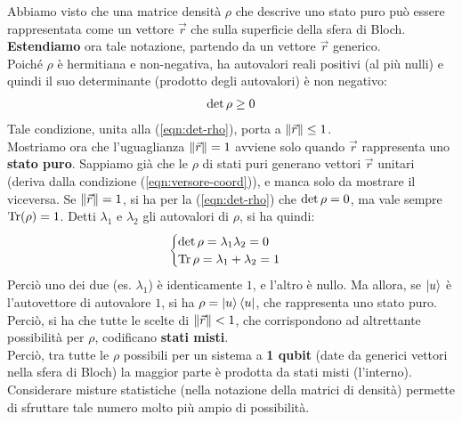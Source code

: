 \documentclass[../../InformazioneQuantistica.tex]{subfiles}
\begin{document}
Abbiamo visto che una matrice densità $\rho$ che descrive uno stato puro può essere rappresentata come un vettore $\vec{r}$ che  sulla superficie della sfera di Bloch.\\

 \textbf{Estendiamo} ora tale notazione, partendo da un vettore $\vec{r}$ generico.\\
Poiché $\rho$ è hermitiana e non-negativa, ha autovalori reali positivi (al più nulli) e quindi il suo determinante (prodotto degli autovalori) è non negativo:
\begin{align*}
\operatorname{det}\rho \geq 0
\end{align*}
Tale condizione, unita alla (\ref{eqn:det-rho}), porta a $\left\lVert\vec{r}\right\rVert\leq 1$.\\

Mostriamo ora che l'uguaglianza $\left\lVert\vec{r}\right\rVert=1$ avviene solo quando $\vec{r}$ rappresenta uno \textbf{stato puro}. Sappiamo già che le $\rho$ di stati puri generano vettori $\vec{r}$ unitari (deriva dalla condizione (\ref{eqn:versore-coord})), e manca solo da mostrare il viceversa. Se $\left\lVert\vec{r}\right\rVert=1$, si ha per la (\ref{eqn:det-rho}) che $\operatorname{det}\rho = 0$, ma vale sempre $\operatorname{Tr}(\rho)=1$. Detti $\lambda_1$ e $\lambda_2$ gli autovalori di $\rho$, si ha quindi:
\begin{align*}
\begin{cases}
\operatorname{det}\rho = \lambda_1\lambda_2 = 0\\
\operatorname{Tr} \rho = \lambda_1 + \lambda_2 = 1
\end{cases}
\end{align*}
Perciò uno dei due (es. $\lambda_1$) è identicamente $1$, e l'altro è nullo. Ma allora, se $\Ket{u}$ è l'autovettore di autovalore $1$, si ha $\rho = \Ket{u}\Bra{u}$, che rappresenta uno stato puro.\\

Perciò, si ha che tutte le scelte di $\left\lVert\vec{r}\right\rVert<1$, che corrispondono ad altrettante possibilità per $\rho$, codificano \textbf{stati misti}.\\
Perciò, tra tutte le $\rho$ possibili per un sistema a \textbf{1 qubit} (date da generici vettori nella sfera di Bloch) la maggior parte è prodotta da stati misti (l'interno). Considerare misture statistiche (nella notazione della matrici di densità) permette di sfruttare tale numero molto più ampio di possibilità.\\
\end{document}
